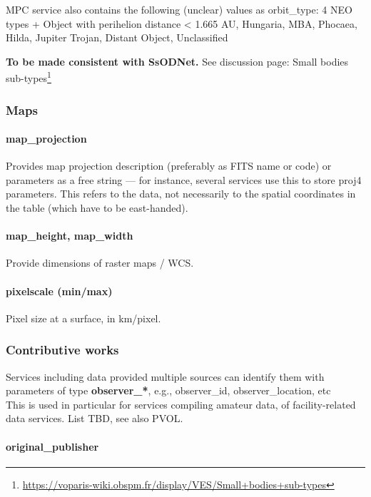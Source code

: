 \documentclass[11pt,a4paper]{ivoa}
\begin{document}
MPC service also contains the following (unclear) values as orbit\_type: 4 NEO types + Object with perihelion distance < 1.665 AU, Hungaria, MBA, Phocaea, Hilda, Jupiter Trojan, Distant Object, Unclassified


\textbf{To be made consistent with SsODNet. }See discussion page: Small bodies sub-types\footnote{\url{https://voparis-wiki.obspm.fr/display/VES/Small+bodies+sub-types}}

\subsubsection{Maps}

\paragraph{map\_projection}

Provides map projection description (preferably as FITS name or code) or parameters as a free string — for instance, several services use this to store proj4 parameters. This refers to the data, not necessarily to the spatial coordinates in the table (which have to be east-handed).

\paragraph{map\_height, map\_width}

Provide dimensions of raster maps / WCS.

\paragraph{pixelscale (min/max)}

Pixel size at a surface, in km/pixel.

\subsubsection{Contributive works}

Services\textbf{ }including data provided multiple sources can identify them with parameters of type \textbf{observer\_*}, e.g., observer\_id, observer\_location, etc\\This is used in particular for services compiling amateur data, of facility-related data services. List TBD, see also PVOL.

\paragraph{original\_publisher}
\end{document}
